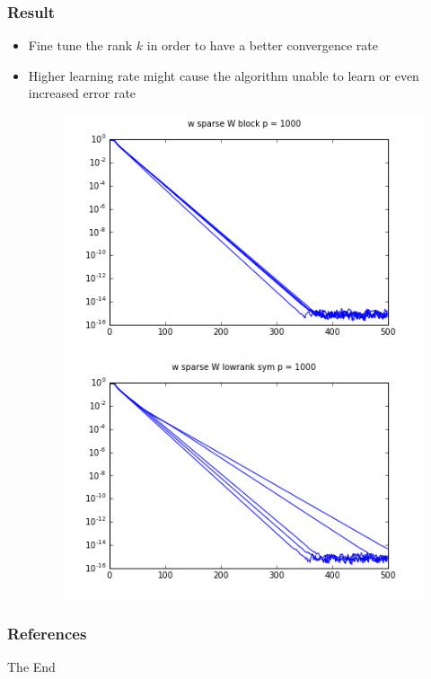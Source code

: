 \documentclass{beamer}
\begin{document}
\begin{frame}
\frametitle{Result}
\begin{itemize}
  \item Fine tune the rank $k$ in order to have a better convergence rate
  \item Higher learning rate might cause the algorithm unable to learn or even increased error rate
  \begin{figure}[htbp]
  \centering
  \begin{minipage}{0.45\textwidth}
    \centering
    \includegraphics[width=.9\textwidth]{images/gfm/w_sparse_W_block_p_100.png}
  \end{minipage}
  \hfill
  \begin{minipage}{0.45\textwidth}
    \centering
    \includegraphics[width=.9\textwidth]{images/gfm/w_sparse_W_lowrank_sym_p_100.png}
  \end{minipage}
  \end{figure}
\end{itemize}

	
\end{frame}


\begin{frame}[allowframebreaks]
\frametitle{References}
\footnotesize
 

\end{frame}


\begin{frame}
\Huge{\centerline{The End}}
\end{frame}

\end{document}
